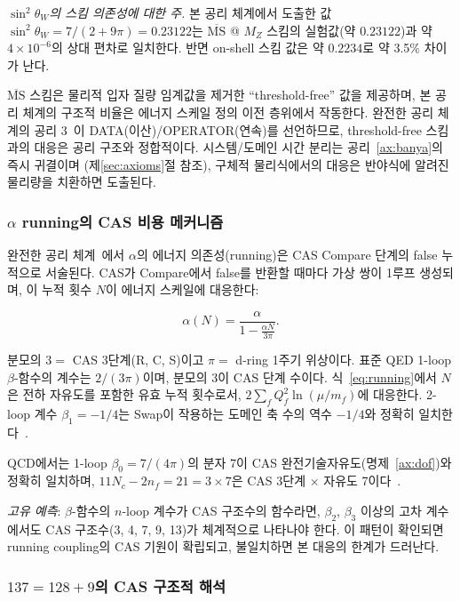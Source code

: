 \documentclass[entropy,article,submit,pdftex,oneauthor]{Definitions/mdpi}
\begin{document}
\emph{$\sin^2\theta_W$의 스킴 의존성에 대한 주.} 본 공리 체계에서 도출한 값 $\sin^2\theta_W = 7/(2+9\pi) = 0.23122$는 $\overline{\mathrm{MS}}$ @ $M_Z$ 스킴의 실험값(약 $0.23122$)과 약 $4 \times 10^{-6}$의 상대 편차로 일치한다. 반면 on-shell 스킴 값은 약 $0.2234$로 약 3.5\% 차이가 난다.

$\overline{\mathrm{MS}}$ 스킴은 물리적 입자 질량 임계값을 제거한 ``threshold-free'' 값을 제공하며, 본 공리 체계의 구조적 비율은 에너지 스케일 정의 이전 층위에서 작동한다. 완전한 공리 체계의 공리 3~\cite{han2026}이 DATA(이산)/OPERATOR(연속)를 선언하므로, threshold-free 스킴과의 대응은 공리 구조와 정합적이다. 시스템/도메인 시간 분리는 공리~\ref{ax:banya}의 즉시 귀결이며 (제\ref{sec:axioms}절 참조), 구체적 물리식에서의 대응은 반야식에 알려진 물리량을 치환하면 도출된다.

\subsubsection{$\alpha$ running의 CAS 비용 메커니즘}
\label{sec:running}

완전한 공리 체계~\cite{han2026}에서 $\alpha$의 에너지 의존성(running)은 CAS Compare 단계의 false 누적으로 서술된다. CAS가 Compare에서 false를 반환할 때마다 가상 쌍이 1루프 생성되며, 이 누적 횟수 $N$이 에너지 스케일에 대응한다:
\begin{linenomath}
\begin{equation}
\alpha(N) = \frac{\alpha}{1 - \frac{\alpha N}{3\pi}}.
\label{eq:running}
\end{equation}
\end{linenomath}
분모의 $3 =$ CAS 3단계(R, C, S)이고 $\pi =$ d-ring 1주기 위상이다. 표준 QED 1-loop $\beta$-함수의 계수는 $2/(3\pi)$이며, 분모의 $3$이 CAS 단계 수이다. 식~\eqref{eq:running}에서 $N$은 전하 자유도를 포함한 유효 누적 횟수로서, $2\sum_f Q_f^2 \ln(\mu/m_f)$에 대응한다. 2-loop 계수 $\beta_1 = -1/4$는 Swap이 작용하는 도메인 축 수의 역수 $-1/4$와 정확히 일치한다~\cite{han2026}.

QCD에서는 1-loop $\beta_0 = 7/(4\pi)$의 분자 $7$이 CAS 완전기술자유도(명제~\ref{ax:dof})와 정확히 일치하며, $11N_c - 2n_f = 21 = 3 \times 7$은 CAS 3단계 $\times$ 자유도 7이다~\cite{han2026}.

\emph{고유 예측}: $\beta$-함수의 $n$-loop 계수가 CAS 구조수의 함수라면, $\beta_2$, $\beta_3$ 이상의 고차 계수에서도 CAS 구조수(3, 4, 7, 9, 13)가 체계적으로 나타나야 한다. 이 패턴이 확인되면 running coupling의 CAS 기원이 확립되고, 불일치하면 본 대응의 한계가 드러난다.

\subsubsection{$137 = 128 + 9$의 CAS 구조적 해석}
\end{document}
